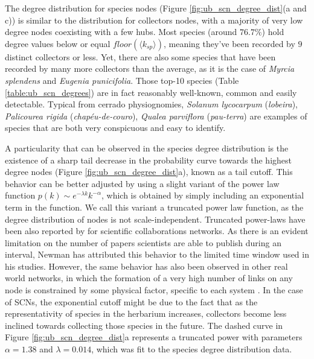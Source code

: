 The degree distribution for species nodes (Figure \ref{fig:ub_scn_degree_dist}(a and c)) is similar to the distribution for collectors nodes, with a majority of very low degree nodes coexisting with a few hubs.
Most species (around $76.7\%$) hold degree values below or equal $floor(\langle k_{sp}\rangle)$, meaning they've been recorded by $9$ distinct collectors or less.
Yet, there are also some species that have been recorded by many more collectors than the average, as it is the case of \textit{Myrcia splendens} and \textit{Eugenia punicifolia}. Those top-10 species (Table \ref{table:ub_scn_degrees}) are in fact reasonably well-known, common and easily detectable. Typical from cerrado physiognomies, \textit{Solanum lycocarpum} (\textit{lobeira}), \textit{Palicourea rigida} (\textit{chapéu-de-couro}), \textit{Qualea parviflora} (\textit{pau-terra}) are examples of species that are both very conspicuous and easy to identify.

A particularity that can be observed in the species degree distribution is the existence of a sharp tail decrease in the probability curve towards the highest degree nodes (Figure \ref{fig:ub_scn_degree_dist}a), known as a tail cutoff.
This behavior can be better adjusted by using a slight variant of the power law function $p(k) \sim e^{-\lambda k} k^{-\alpha}$, which is obtained by simply including an exponential term in the function. We call this variant a truncated power law function, as the degree distribution of nodes is not scale-independent.
Truncated power-laws have been also reported by  for scientific collaborations networks. 
As there is an evident limitation on the number of papers scientists are able to publish during an interval, Newman has attributed this behavior to the limited time window used in his studies. 
However, the same behavior has also been observed in other real world networks, in which the formation of a very high number of links on any node is constrained by some physical factor, specific to each system \cite{Albert2002}. 
In the case of SCNs, the exponential cutoff might be due to the fact that as the representativity of species in the herbarium increases, collectors become less inclined towards collecting those species in the future. 
The dashed curve in Figure \ref{fig:ub_scn_degree_dist}a represents a truncated power with parameters $\alpha=1.38$ and $\lambda =0.014$, which was fit to the species degree distribution data.


